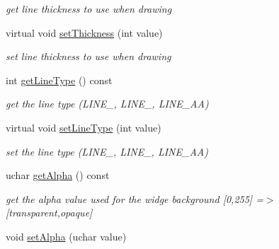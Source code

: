 \begin{DoxyCompactItemize}
\begin{DoxyCompactList}\small\item\em get line thickness to use when drawing \end{DoxyCompactList}\item 
virtual void \hyperlink{classcanvascv_1_1Widget_a8514776cac6c75fb723eefafa9b5b8b6}{set\+Thickness} (int value)\hypertarget{classcanvascv_1_1Widget_a8514776cac6c75fb723eefafa9b5b8b6}{}\label{classcanvascv_1_1Widget_a8514776cac6c75fb723eefafa9b5b8b6}

\begin{DoxyCompactList}\small\item\em set line thickness to use when drawing \end{DoxyCompactList}\item 
int \hyperlink{classcanvascv_1_1Widget_a09656f51cc84ab95048191083ff7cfa7}{get\+Line\+Type} () const \hypertarget{classcanvascv_1_1Widget_a09656f51cc84ab95048191083ff7cfa7}{}\label{classcanvascv_1_1Widget_a09656f51cc84ab95048191083ff7cfa7}

\begin{DoxyCompactList}\small\item\em get the line type (L\+I\+N\+E\+\_, L\+I\+N\+E\+\_, L\+I\+N\+E\+\_\+\+AA) \end{DoxyCompactList}\item 
virtual void \hyperlink{classcanvascv_1_1Widget_ad61f8a9fe81e1d1e7247a83b2eefc52a}{set\+Line\+Type} (int value)\hypertarget{classcanvascv_1_1Widget_ad61f8a9fe81e1d1e7247a83b2eefc52a}{}\label{classcanvascv_1_1Widget_ad61f8a9fe81e1d1e7247a83b2eefc52a}

\begin{DoxyCompactList}\small\item\em set the line type (L\+I\+N\+E\+\_, L\+I\+N\+E\+\_, L\+I\+N\+E\+\_\+\+AA) \end{DoxyCompactList}\item 
uchar \hyperlink{classcanvascv_1_1Widget_a5e7e4bfb43a2c8179114ed63a2e25cff}{get\+Alpha} () const \hypertarget{classcanvascv_1_1Widget_a5e7e4bfb43a2c8179114ed63a2e25cff}{}\label{classcanvascv_1_1Widget_a5e7e4bfb43a2c8179114ed63a2e25cff}

\begin{DoxyCompactList}\small\item\em get the alpha value used for the widge background \mbox{[}0,255\mbox{]} =$>$ \mbox{[}transparent,opaque\mbox{]} \end{DoxyCompactList}\item 
void \hyperlink{classcanvascv_1_1Widget_a4c16525b31e70acd43372af0c1e60d42}{set\+Alpha} (uchar value)\hypertarget{classcanvascv_1_1Widget_a4c16525b31e70acd43372af0c1e60d42}{}\label{classcanvascv_1_1Widget_a4c16525b31e70acd43372af0c1e60d42}


\end{DoxyCompactItemize}
